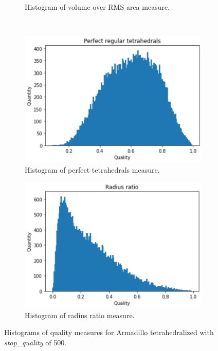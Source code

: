 \begin{figure}
\begin{subfigure}[b]{0.49\linewidth}
		\caption{Histogram of volume over RMS area measure.}
		\label{voa1}
	\end{subfigure}
	\\
	\begin{subfigure}[b]{0.49\linewidth}
		\centering
		\includegraphics[width=\linewidth]{Materials/E1/pt1}
		\caption{Histogram of perfect tetrahedrals measure.}
		\label{pt1}
	\end{subfigure}
	\hfill
	\begin{subfigure}[b]{0.49\linewidth}
		\centering
		\includegraphics[width=\linewidth]{Materials/E1/rr1}
		\caption{Histogram of radius ratio measure.}
		\label{rr1}
	\end{subfigure}
	\caption{Histograms of quality measures for Armadillo tetrahedralized with \textit{stop\_quality} of 500.}
	\label{initial}
\end{figure} 
